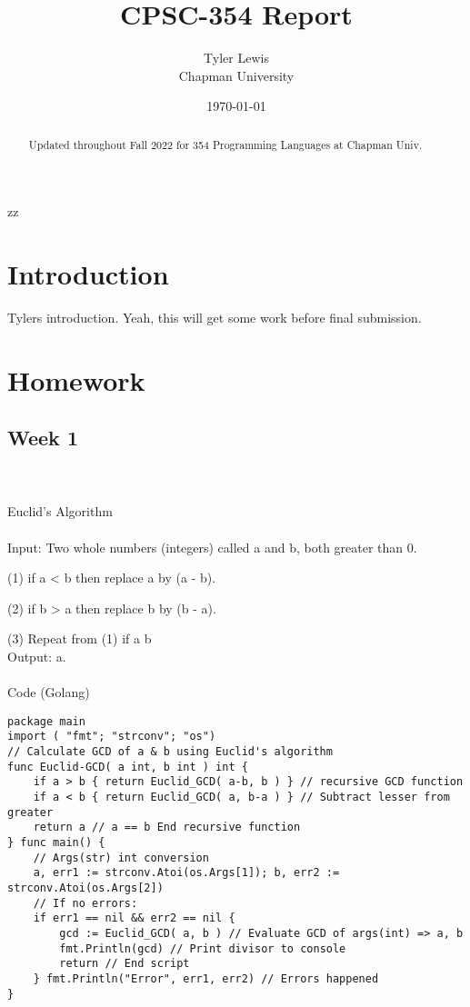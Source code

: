 zz\documentclass{article}
\title{CPSC-354 Report}
\author{Tyler Lewis  \\ Chapman University}
\date{\today}
\theoremstyle{theorem}
\theoremstyle{definition}
\theoremstyle{remark}
\begin{document}
\setlength\parindent{24pt}

\maketitle

\begin{abstract}
Updated throughout Fall 2022 for 354 Programming Languages at Chapman Univ.
\end{abstract}

\tableofcontents

\section{Introduction}\label{intro}

Tylers introduction. Yeah, this will get some work before final submission. 


\section{Homework}\label{homework}

\subsection{Week 1}

{\large \\\\Euclid's Algorithm\\\\}
Input: Two whole numbers (integers) called a and b, both greater than 0.

(1) if a {\textless} b then replace a by (a - b). 

(2) if b {\textgreater} a then replace b by (b - a).

(3) Repeat from (1) if a {\neq} b \\ 

Output: a.\\\\

{\large Code (Golang)}
\begin{lstlisting}
package main
import ( "fmt"; "strconv"; "os")
// Calculate GCD of a & b using Euclid's algorithm
func Euclid-GCD( a int, b int ) int {
    if a > b { return Euclid_GCD( a-b, b ) } // recursive GCD function
    if a < b { return Euclid_GCD( a, b-a ) } // Subtract lesser from greater
	return a // a == b End recursive function
} func main() {
    // Args(str) int conversion 
	a, err1 := strconv.Atoi(os.Args[1]); b, err2 := strconv.Atoi(os.Args[2])
    // If no errors:
	if err1 == nil && err2 == nil {
		gcd := Euclid_GCD( a, b ) // Evaluate GCD of args(int) => a, b
		fmt.Println(gcd) // Print divisor to console
		return // End script
    } fmt.Println("Error", err1, err2) // Errors happened
}
\end{lstlisting}
\end{document}
